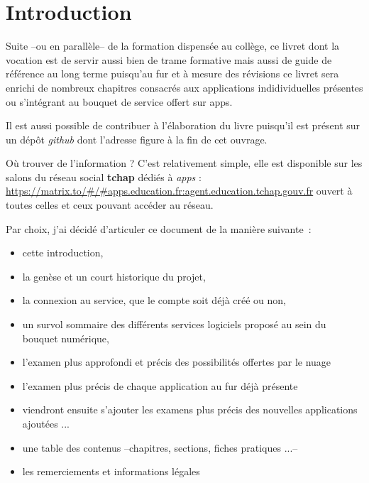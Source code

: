\chapter*{Introduction}

Suite --ou en parallèle-- de la formation dispensée au collège, ce livret dont la vocation est de servir aussi bien de trame formative mais aussi de guide de référence au long terme puisqu'au fur et à mesure des révisions ce livret sera enrichi de nombreux chapitres consacrés aux applications indidividuelles présentes ou s'intégrant au bouquet de service offert sur apps.

Il est aussi possible de contribuer à l'élaboration du livre puisqu'il est présent sur un dépôt \emph{github} dont l'adresse figure à la fin de cet ouvrage. 

Où trouver de l'information ? C'est relativement simple, elle est disponible sur les salons du réseau social \textbf{tchap} dédiés à \emph{apps} : \url{https://matrix.to/#/#apps.education.fr:agent.education.tchap.gouv.fr} ouvert à toutes celles et ceux pouvant accéder au réseau.

Par choix, j'ai décidé d'articuler ce document de la manière suivante~:
\begin{itemize}
	\item cette introduction,
	\item la genèse et un court historique du projet,
	\item la connexion au service, que le compte soit déjà créé ou non,
	\item un survol sommaire des différents services logiciels proposé au sein du bouquet numérique,
	\item l'examen plus approfondi et précis des possibilités offertes par le nuage
	\item l'examen plus précis de chaque application au fur déjà présente
	\item viendront ensuite s'ajouter les examens plus précis des nouvelles applications ajoutées ...
	\item une table des contenus --chapitres, sections, fiches pratiques ...-- 
	\item les remerciements et informations légales
\end{itemize}

